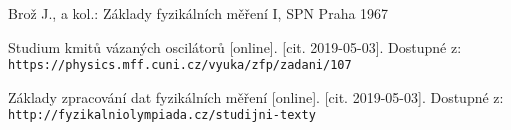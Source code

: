 \documentclass[a4paper]{article}
\begin{document}
\renewcommand\refname{Použitá literatura}
\begin{thebibliography}{}

Brož J., a kol.: Základy fyzikálních měření I, SPN Praha 1967 
 
Studium kmitů vázaných oscilátorů [online]. [cit. 2019-05-03]. Dostupné z: 
\\\texttt{https://physics.mff.cuni.cz/vyuka/zfp/zadani/107}
 
Základy zpracování dat fyzikálních měření [online]. [cit. 2019-05-03].
\newline Dostupné z:\\\texttt{http://fyzikalniolympiada.cz/studijni-texty}
\end{thebibliography}
\end{document}
